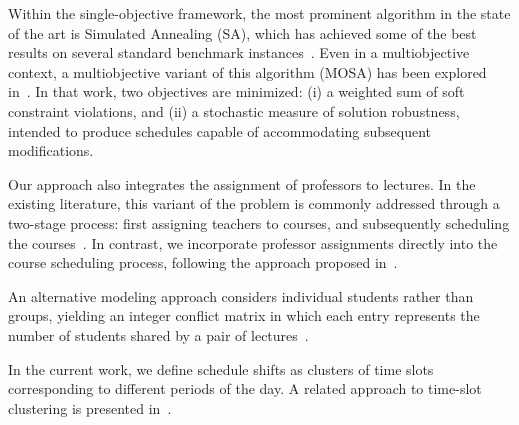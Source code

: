 
Within the single-objective framework, the most prominent algorithm in the state of the art is Simulated Annealing (SA), which has achieved some of the best results on several standard benchmark instances~\cite{ceschia2012design}. Even in a multiobjective context, a multiobjective variant of this algorithm (MOSA) has been explored in~\cite{akkan2022bi}. In that work, two objectives are minimized: (i) a weighted sum of soft constraint violations, and (ii) a stochastic measure of solution robustness, intended to produce schedules capable of accommodating subsequent modifications.

Our approach also integrates the assignment of professors to lectures. In the existing literature, this variant of the problem is commonly addressed through a two-stage process: first assigning teachers to courses, and subsequently scheduling the courses~\cite{chavez2020modeling,gunawan2012hybridized}. In contrast, we incorporate professor assignments directly into the course scheduling process, following the approach proposed in~\cite{arratia2021university}.

An alternative modeling approach considers individual students rather than groups, yielding an integer conflict matrix in which each entry represents the number of students shared by a pair of lectures~\cite{tripathy1992computerised}.

In the current work, we define schedule shifts as clusters of time slots corresponding to different periods of the day. A related approach to time-slot clustering is presented in~\cite{arratia2021university}.
